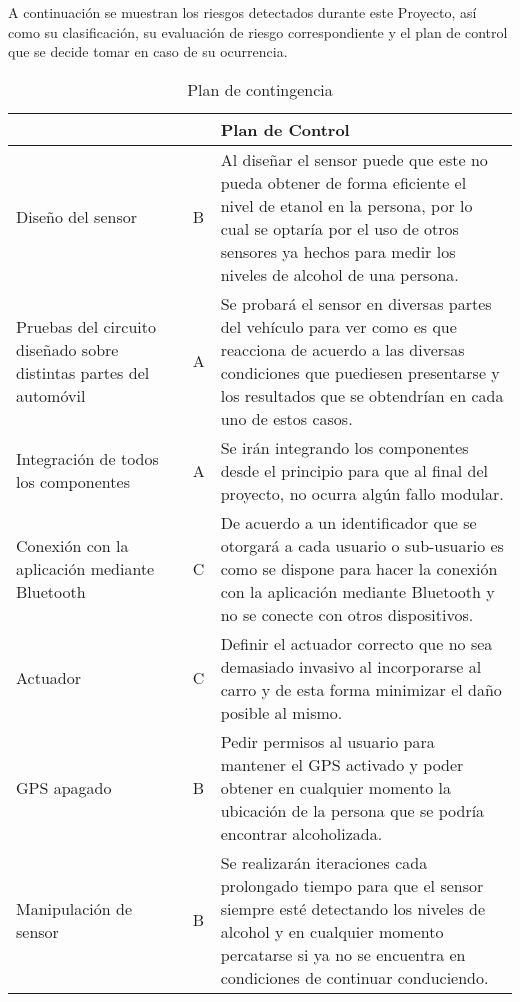 A continuación se muestran los riesgos detectados durante este Proyecto, así como su clasificación, su evaluación de riesgo correspondiente y el plan de control que se decide tomar en caso de su ocurrencia.

\begin{center}
\begin{table}[!htb]
\centering
\begin{tabular}{|p{4cm}|p{2cm}|p{2cm}|p{5cm}|}
    \hline
    \centering {\bfseries Tipo de Riesgo}  & \centering {\bfseries CR} & \centering {\bfseries VR} & {\bfseries Plan de Control} \\ \hline
    
    \centering Diseño del sensor & \centering 2 & \centering B & Al diseñar el sensor puede que este no pueda obtener de forma eficiente el nivel de etanol en la persona, por lo cual se optaría por el uso de otros sensores ya hechos para medir los niveles de alcohol de una persona.\\ \hline
    
    \centering Pruebas del circuito diseñado sobre distintas partes del automóvil & \centering 1 & \centering A & Se probará el sensor en diversas partes del vehículo para ver como es que reacciona de acuerdo a las diversas condiciones que puediesen presentarse y los resultados que se obtendrían en cada uno de estos casos.\\ \hline
    
    \centering Integración de todos los componentes & \centering 3 & \centering A & Se irán integrando los componentes desde el principio para que al final del proyecto, no ocurra algún fallo modular.\\ \hline
    
    \centering Conexión con la aplicación mediante Bluetooth & \centering 2 & \centering C & De acuerdo a un identificador que se otorgará a cada usuario o sub-usuario es como se dispone para hacer la conexión con la aplicación mediante Bluetooth y no se conecte con otros dispositivos.\\ \hline
    
    \centering Actuador & \centering 2 & \centering C & Definir el actuador correcto que no sea demasiado invasivo al incorporarse al carro y de esta forma minimizar el daño posible al mismo.\\ \hline
    
    \centering GPS apagado & \centering 3 & \centering B & Pedir permisos al usuario para mantener el GPS activado y poder obtener en cualquier momento la ubicación de la persona que se podría encontrar alcoholizada.\\ \hline
    
    \centering Manipulación de sensor & \centering 3 & \centering B & Se realizarán iteraciones cada prolongado tiempo para que el sensor siempre esté detectando los niveles de alcohol y en cualquier momento percatarse si ya no se encuentra en condiciones de continuar conduciendo.\\ \hline

\end{tabular}
\caption{Plan de contingencia}
\label{tab:pan_contingencia}
\end{table}
\end{center}
